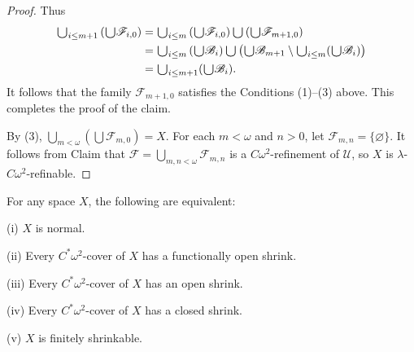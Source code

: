 \documentclass[jisng5i.tex]{subfiles}
\begin{document}
\begin{proof}
Thus
\begin{equation*}
\begin{aligned}
\raisebox{-2pt}{\scalebox{1.5}{$\cup$}}_{i \le m+1} \left(\raisebox{-2pt}{\scalebox{1.5}{$\cup$}} \mathscr{F}_{i,0}\right) &= 
    \raisebox{-2pt}{\scalebox{1.5}{$\cup$}}_{i \le m} \left(\raisebox{-2pt}{\scalebox{1.5}{$\cup$}} \mathscr{F}_{i,0}\right)  \raisebox{-2pt}{\scalebox{1.5}{$\cup$}}
    \left(\raisebox{-2pt}{\scalebox{1.5}{$\cup$}} \mathscr{F}_{m+1,0}\right) \\
  &= \raisebox{-2pt}{\scalebox{1.5}{$\cup$}}_{i \le m} \left(\raisebox{-2pt}{\scalebox{1.5}{$\cup$}} \mathscr{B}_{i}\right) \raisebox{-2pt}{\scalebox{1.5}{$\cup$}}
      \left(\raisebox{-2pt}{\scalebox{1.5}{$\cup$}}\mathscr{B}_{m+1}\setminus\raisebox{-2pt}{\scalebox{1.5}{$\cup$}}_{i\le m}(\raisebox{-2pt}{\scalebox{1.5}{$\cup$}}\mathscr{B}_i)\right) \\
  & = \raisebox{-2pt}{\scalebox{1.5}{$\cup$}}_{i\le m+ 1}(\raisebox{-2pt}{\scalebox{1.5}{$\cup$}}\mathscr{B}_i).
\end{aligned}
\end{equation*}
It follows that the family $\mathscr{F}_{m+1,0}$ satisfies the Conditions (1)–(3) above. 
This completes the proof of the claim.

By (3), $\bigcup_{m < \omega} (\bigcup \mathscr{F}_{m,0}) = X$. For each $m < \omega$ and $n> 0$, 
let $\mathscr{F}_{m,n} = \{\varnothing\}$. It follows from Claim that 
$\mathscr{F} = \bigcup_{m,n < \omega} \mathscr{F}_{m,n}$ is a $C\omega^2$-refinement of $\mathscr{U}$, so $X$ is $\lambda$-$C\omega^2$-refinable.
\end{proof}


{\theorem{} \label{th:5.2.8}
For any space $X$, the following are equivalent:

\textup{(i)} $X$ is normal.

\textup{(ii)} Every $C^*\omega^2$-cover of $X$ has a functionally open shrink.

\textup{(iii)} Every $C^*\omega^2$-cover of $X$ has an open shrink.

\textup{(iv)} Every $C^*\omega^2$-cover of $X$ has a closed shrink.

\textup{(v)} $X$ is finitely shrinkable.
}
\end{document}
